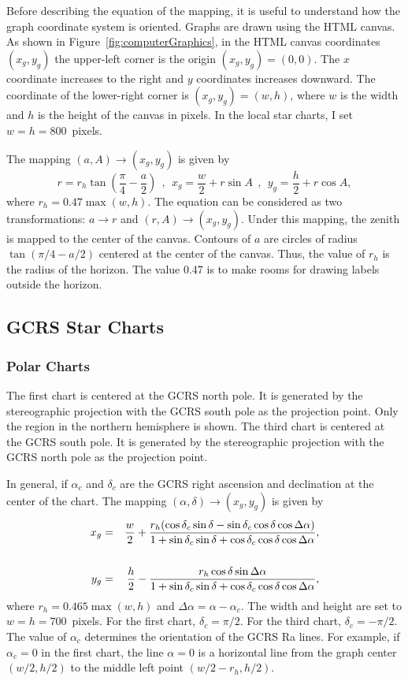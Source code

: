 \documentclass[12pt]{article}
\newcommand \beq {\begin{equation}}
\newcommand \eeq {\end{equation}}
\newcommand \beqn {\begin{eqnarray}}
\newcommand \eeqn {\end{eqnarray}}
\begin{document}
Before describing the equation of the mapping, it is useful to understand how the 
graph coordinate system is oriented. Graphs are drawn using the HTML canvas. 
As shown in Figure~\ref{fig:computerGraphics}, in the HTML canvas coordinates $(x_g,y_g)$
the upper-left corner is the origin $(x_g,y_g)=(0,0)$. The $x$ coordinate increases to the 
right and $y$ coordinates increases downward. The coordinate of the lower-right 
corner is $(x_g,y_g)=(w,h)$, where $w$ is the width and $h$ is the height of the canvas 
in pixels. In the local star charts, I set $w=h=800$~pixels.

The mapping $(a,A) \rightarrow (x_g,y_g)$ is given by 
\beq 
  r = r_h \tan\left( \frac{\pi}{4} -\frac{a}{2}\right) \ \ , \ \ 
  x_g = \frac{w}{2} + r \sin A \ \ , \ \ y_g = \frac{h}{2} + r \cos A , 
\label{eq:stereographicHor}
\eeq
where $r_h = 0.47\max(w,h)$. The equation can be considered as two transformations: 
$a \rightarrow r$ and $(r,A) \rightarrow (x_g, y_g)$. Under this mapping, the zenith 
is mapped to the center of the canvas. Contours of $a$ are circles 
of radius $\tan(\pi/4 - a/2)$ centered at the center of the canvas. Thus, the value of 
$r_h$ is the radius of the horizon. The value 0.47 is to make rooms for drawing labels 
outside the horizon.

\subsection{GCRS Star Charts}

\subsubsection{Polar Charts} 

The first chart is centered at the GCRS north pole. It is generated by 
the stereographic projection with the GCRS south pole as the projection 
point. Only the region in the northern hemisphere is shown. The third chart 
is centered at the GCRS south pole. It is generated by the stereographic projection 
with the GCRS north pole as the projection point. 

In general, if $\alpha_c$ and $\delta_c$ are the GCRS right ascension and declination 
at the center of the chart. The mapping $(\alpha,\delta) \rightarrow (x_g,y_g)$ is 
given by 
\beqn
  x_g &=& \frac{w}{2} + \frac{r_h (\cos \delta_c \sin \delta 
- \sin \delta_c \cos \delta \cos \Delta \alpha )}{1 + \sin \delta_c \sin \delta 
+ \cos \delta_c \cos \delta \cos \Delta \alpha} ,
\label{eq:stereographicXg} \\ \cr
  y_g &=& \frac{h}{2} - \frac{r_h \cos \delta \sin \Delta \alpha}{1 + 
\sin \delta_c \sin \delta + \cos \delta_c \cos \delta \cos \Delta \alpha} , 
\label{eq:stereographicYg}
\eeqn
where $r_h = 0.465\max(w,h)$ and $\Delta \alpha = \alpha - \alpha_c$. 
The width and height are set to $w=h=700$~pixels.
For the first chart, $\delta_c=\pi/2$. For the third chart, $\delta_c=-\pi/2$. 
The value of $\alpha_c$ determines the orientation of the GCRS Ra lines. 
For example, if $\alpha_c=0$ in the first chart, the line $\alpha=0$ 
is a horizontal line from the graph center $(w/2,h/2)$ to the 
middle left point $(w/2 - r_h, h/2)$. 
\end{document}
